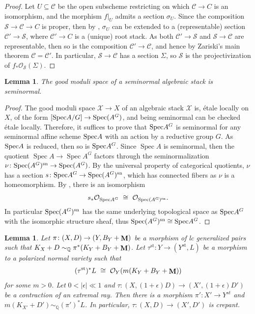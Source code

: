 \documentclass[a4paper,12pt]{amsart}
\DeclareMathOperator{\st}{st}
\DeclareMathOperator{\Spec}{Spec}
\newcommand{\bQ}{{\mathbb Q}}
\newcommand{\cX}{{\mathcal{X}}}
\newcommand{\cO}{{\mathcal{O}}}
\DeclareMathOperator{\bfM}{{\bf{M}}}
\DeclareMathOperator{\sn}{sn}
\newcommand\spec{\text{\rm Spec}}
\newcommand\cS{{\mathcal{S}}}
\newcommand\cC{{\mathcal{C}}}
\newtheorem{lemma}[theorem]{Lemma}
\theoremstyle{definition}
\theoremstyle{remark}
\begin{document}
\begin{proof}
    Let $U\subseteq \cC$ be the open subscheme  restricting on which $\cC\rightarrow C$ is an isomorphism, and the morphism $f|_U$ admits a section $\sigma_U$. Since the composition $\cS\rightarrow \cC\rightarrow C$ is proper, then by \cite[Theorem 3.1]{BV24}, $\sigma_U$ can be extended to a (representable) section $\cC'\to \cS$, where $\cC'\rightarrow C$ is a (unique) root stack. As both $\cC'\to \cS$ and $\cS\to \cC$ are representable, then so is the composition $\cC'\to \cC$, and hence by Zariski's main theorem $\cC=\cC'$. In particular, $\cS\to \cC$ has a section $\Sigma$, so $\cS$ is the projectivization of $f_*\cO_{\cS}(\Sigma)$.
\end{proof}
\begin{lemma}\label{lemma_gms_of_seminormal_is_seminormal}
     The good moduli space of a seminormal algebraic stack is seminormal.
\end{lemma}
\begin{proof} The good moduli space $\cX\to X$ of an algebraic stack $\cX$ is, \'etale locally on $X$, of the form $[\spec A/G]\to \spec(A^G)$, and being seminormal can be checked \'etale locally. Therefore, it suffices to prove that $\spec A^G$ is seminormal for any seminormal affine scheme $\spec A$ with an action by a reductive group $G$. As $\spec A$ is reduced, then so is $\spec A^G$. Since $\Spec A$ is seminormal, then the quotient $\Spec A\rightarrow \Spec A^G$ factors through the seminormalization $\nu\colon \spec (A^G)^{\sn}\to\spec(A^G)$. By the universal property of categorical quotients, $\nu$ has a section $s\colon \spec A^G\to \spec(A^G)^{\sn}$, which has connected fibers as $\nu$ is a homeomorphism. By \cite[Lemma 2.3]{MR4705376}, there is an isomorphism
    \[
    s_*\cO_{\spec A^G} \ \cong  \ \cO_{\spec(A^G)^{\sn}}.
    \] 
    In particular $\spec(A^G)^{\sn}$ has the same underlying topological space as $\spec A^G$ with the isomorphic structure sheaf, thus $\spec(A^G)^{\sn}\cong \spec A^G$. 
\end{proof}

\begin{lemma}\label{lemma_flops_are_crepant}
    Let $\pi\colon (X,D)\to (Y,B_Y+\bfM)$ be a morphism of lc generalized pairs such that $K_X+D\sim_\bQ \pi^*(K_Y+B_Y+\bfM)$. Let $\tau^{\st}\colon Y\to (Y^{\st},L)$ be a morphism to a polarized normal variety such that \[(\tau^{\st})^*L  \ \cong\  \cO_Y(m(K_Y+B_Y+\bfM))\] for some $m>0$.
    Let $0<|\epsilon| \ll 1$ and $\tau\colon (X,(1+\epsilon)D)\to (X',(1+\epsilon)D')$ be a contraction of an extremal ray. Then there is a morphism $\pi'\colon X'\to Y^{st}$ and $m(K_{X'}+D')\sim_\bQ(\pi')^*L$. In particular, $\tau:(X,D)\rightarrow (X',D')$ is crepant.
\end{lemma}
\end{document}
